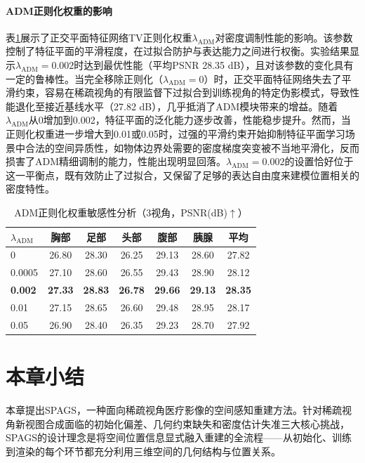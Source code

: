 \paragraph{ADM正则化权重的影响}
表\ref{tab:spags_adm_hyper}展示了正交平面特征网络TV正则化权重$\lambda_{\text{ADM}}$对密度调制性能的影响。该参数控制了特征平面的平滑程度，在过拟合防护与表达能力之间进行权衡。实验结果显示$\lambda_{\text{ADM}}=0.002$时达到最优性能（平均PSNR 28.35 dB），且对该参数的变化具有一定的鲁棒性。当完全移除正则化（$\lambda_{\text{ADM}}=0$）时，正交平面特征网络失去了平滑约束，容易在稀疏视角的有限监督下过拟合到训练视角的特定伪影模式，导致性能退化至接近基线水平（27.82 dB），几乎抵消了ADM模块带来的增益。随着$\lambda_{\text{ADM}}$从0增加到0.002，特征平面的泛化能力逐步改善，性能稳步提升。然而，当正则化权重进一步增大到0.01或0.05时，过强的平滑约束开始抑制特征平面学习场景中合法的空间异质性，如物体边界处需要的密度梯度突变被不当地平滑化，反而损害了ADM精细调制的能力，性能出现明显回落。$\lambda_{\text{ADM}}=0.002$的设置恰好位于这一平衡点，既有效防止了过拟合，又保留了足够的表达自由度来建模位置相关的密度特性。

\begin{table}[htbp]
    \centering
    \caption{ADM正则化权重敏感性分析（3视角，PSNR(dB)$\uparrow$）}
    \label{tab:spags_adm_hyper}
    \begin{tabular*}{0.85\textwidth}{@{\extracolsep{\fill}}lcccccc@{}}
        \toprule
        $\lambda_{\text{ADM}}$ & 胸部 & 足部 & 头部 & 腹部 & 胰腺 & 平均 \\
        \midrule
        0 & 26.80 & 28.30 & 26.25 & 29.13 & 28.60 & 27.82 \\
        0.0005 & 27.10 & 28.60 & 26.55 & 29.43 & 28.90 & 28.12 \\
        \textbf{0.002} & \textbf{27.33} & \textbf{28.83} & \textbf{26.78} & \textbf{29.66} & \textbf{29.13} & \textbf{28.35} \\
        0.01 & 27.15 & 28.65 & 26.60 & 29.48 & 28.95 & 28.17 \\
        0.05 & 26.90 & 28.40 & 26.35 & 29.23 & 28.70 & 27.92 \\
        \bottomrule
    \end{tabular*}
\end{table}


\section{本章小结}

本章提出SPAGS，一种面向稀疏视角医疗影像的空间感知重建方法。针对稀疏视角新视图合成面临的初始化偏差、几何约束缺失和密度估计失准三大核心挑战，SPAGS的设计理念是将空间位置信息显式融入重建的全流程——从初始化、训练到渲染的每个环节都充分利用三维空间的几何结构与位置关系。


